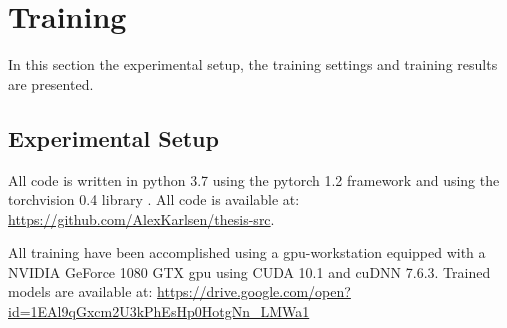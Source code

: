 
\section{Training}

In this section the experimental setup, the training settings and training results are presented.  

\subsection{Experimental Setup}

All code is written in \gls{python} 3.7 \cite{van_rossum_python_1995} using the \gls{pytorch} 1.2
framework \cite{paszke_automatic_2017} and using the \gls{torchvision} 0.4 library \cite{marcel_torchvision_2010}. All code is available at:
{\color{sns-grey}\url{https://github.com/AlexKarlsen/thesis-src}}. 

All training have been accomplished using a \gls{gpu}-workstation equipped with a NVIDIA GeForce 1080 GTX \gls{gpu} using CUDA 10.1 and cuDNN 7.6.3. Trained models are available at: {\color{sns-grey}\url{https://drive.google.com/open?id=1EAl9qGxcm2U3kPhEsHp0HotgNn_LMWa1}} 



